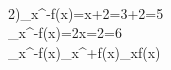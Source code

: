 \\2)\lim_{x^-}f(x)=x+2=3+2=5
\\\lim_{x^-}f(x)=2x=2=6
\\\lim_{x^-}f(x)\neq\lim_{x^+}f(x)\Rightarrow\nexists\lim_{x}f(x)